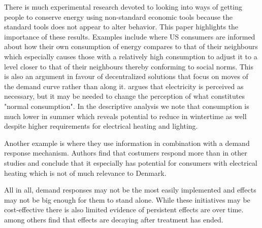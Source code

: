 There is much experimental research devoted to looking into ways of getting people to conserve energy using non-standard economic tools because the standard tools does not appear to alter behavior. This paper highlights the importance of these results. Examples include \citet{allcott2011social} where US consumers are informed about how their own consumption of energy compares to that of their neighbours which especially causes those with a relatively high consumption to adjust it to a level closer to that of their neighbours thereby conforming to social norms. This is also an argument in favour of decentralized solutions that focus on moves of the demand curve rather than along it. \citet{kirschen2003demand} argues that electricity is perceived as necessary, but it may be needed to change the perception of what constitutes "normal consumption". In the descriptive analysis we note that consumption is much lower in summer which reveals potential to reduce in wintertime as well despite higher requirements for electrical heating and lighting.
\par Another example is \citet{saele2011demand} where they use information in combination with a demand response mechanism. Authors find that costumers respond more than in other studies and conclude that it especially has potential for consumers with electrical heating which is not of much relevance to Denmark.\bigskip

All in all, demand responses may not be the most easily implemented and effects may not be big enough for them to stand alone. While these initiatives may be cost-effective there is also limited evidence of persistent effects are over time. \citet{allcott2014short} among others find that effects are decaying after treatment has ended.

